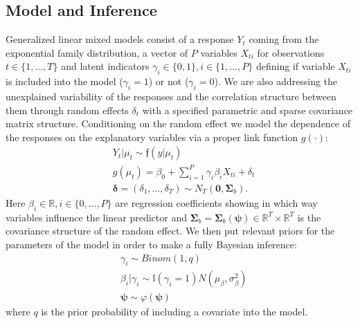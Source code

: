 \documentclass[a0,portrait]{a0poster}
\begin{document}
\begin{multicols}{2}

\color{DarkSlateGray} %

\section*{Model and Inference}

Generalized linear mixed models consist of a response $Y_{t}$ coming from the exponential family distribution, a vector of $P$ variables $X_{ti}$ for observations $t \in \{1,...,T\}$ and latent indicators $\gamma_i\in\{0,1\}, i \in \{1,...,P\}$ defining if variable $X_{ti}$ is  included into the model ($\gamma_i = 1$) or not ($\gamma_i = 0$). We are also addressing the unexplained variability of the responses and the correlation structure between them through random effects $\delta_t$ with a specified parametric and sparse covariance matrix structure. Conditioning on the random effect we model the dependence of the responses on the explanatory variables via a proper link function $g(\cdot)$:
\begin{eqnarray} \label{themodeleq}
  &Y_t|\mu_t \sim  \mathfrak{f}(y|\mu_t)\\
  &g(\mu_t) =   \beta_0 + \sum_{i=1}^{P} \gamma_i\beta_{i}X_{ti} + \delta_t\\
 &\boldsymbol{\delta} = (\delta_1,...,\delta_T) \sim N_T\left(\boldsymbol{0},\boldsymbol{\Sigma}_b\right).\label{themodeleqend}
\end{eqnarray}
Here $\beta_i \in \mathbb{R}, i \in \{0,...,P\}$ are regression coefficients showing in which way variables influence the linear predictor and $\boldsymbol{\Sigma}_b = \boldsymbol{\Sigma}_b\left(\boldsymbol{\psi}\right) \in \mathbb{R}^T\times\mathbb{R}^T$ is the covariance structure of the random effect. We then put relevant priors for the parameters of the model in order to make a fully Bayesian inference:
\begin{eqnarray}
&\gamma_i \sim Binom(1,q)\label{glmgammaprior}\\	
&\beta_i|\gamma_i \sim \mathbb{I}(\gamma_i = 1) N(\mu_\beta,\sigma_{\beta}^2)\label{glmbetarprior}\\
&\boldsymbol{\psi}\sim\varphi(\boldsymbol{\psi})\label{latentprior}
\end{eqnarray}
where $q$ is the prior probability of including a covariate into the model. 


\end{multicols}
\end{document}
